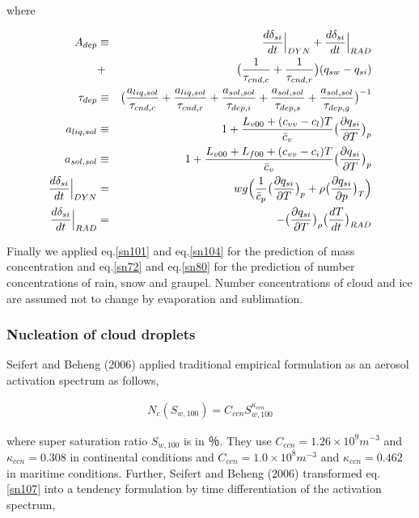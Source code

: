 where

\begin{eqnarray}
A_{dep}&\equiv&\frac{d\delta_{si}}{dt}\Bigr|_{DYN}+\frac{d\delta_{si}}{dt}\Bigr|_{RAD}\nonumber\\
&+&\bigl(\frac{1}{\tau_{cnd,c}}+\frac{1}{\tau_{cnd,r}}\bigr)(q_{sw}-q_{si})\label{sn105}\\
\tau_{dep}&\equiv&\bigl(\frac{a_{liq,sol}}{\tau_{cnd,c}}+\frac{a_{liq,sol}}{\tau_{cnd,r}}+\frac{a_{sol,sol}}{\tau_{dep,i}}+\frac{a_{sol,sol}}{\tau_{dep,s}}+\frac{a_{sol,sol}}{\tau_{dep,g}}\bigr)^{-1}\label{sn106}\\
a_{liq,sol}&\equiv&1+\frac{L_{v00}+(c_{vv}-c_{l})T}{\bar{c}_{v}}\bigl(\frac{\partial q_{si}}{\partial T}\bigr)_{p}\nonumber\\
a_{sol,sol}&\equiv&1+\frac{L_{v00}+L_{f00}+(c_{vv}-c_{i})T}{\bar{c}_{v}}\bigl(\frac{\partial q_{si}}{\partial T}\bigr)_{p}\nonumber\\
\frac{d\delta_{si}}{dt}\Bigr|_{DYN}&=&wg\Bigl(\frac{1}{\bar{c}_{p}}\bigl(\frac{\partial q_{si}}{\partial T}\bigr)_{p}+\rho\bigl(\frac{\partial q_{si}}{\partial p}\bigr)_{T}\Bigr)\nonumber\\
\frac{d\delta_{si}}{dt}\Bigl|_{RAD}&=&-\bigl(\frac{\partial q_{si}}{\partial T}\bigr)_{\rho}\bigl(\frac{dT}{dt}\bigr)_{RAD}\nonumber
\end{eqnarray}

Finally we applied eq.\ref{sn101} and eq.\ref{sn104} for the prediction of mass concentration and eq.\ref{sn72} and eq.\ref{sn80} for the prediction of number concentrations of rain, snow and graupel. Number concentrations of cloud and ice are assumed not to change by evaporation and sublimation.


\subsubsection{Nucleation of cloud droplets}
Seifert and Beheng (2006) applied traditional empirical formulation as an aerosol activation spectrum as follows,

\begin{eqnarray}
N_{c}(S_{w,100})=C_{ccn}S_{w,100}^{\kappa_{ccn}}\label{sn107}
\end{eqnarray}

where super saturation ratio $S_{w,100}$ is in ％. They use $C_{ccn} = 1.26 \times 10^{9} m^{-3}$ and $\kappa_{ccn} = 0.308$ in continental conditions and $C_{ccn} = 1.0 \times 10^{8} m^{-3}$ and $\kappa_{ccn} = 0.462$ in maritime conditions. Further, Seifert and Beheng (2006) transformed eq.\ref{sn107} into a tendency formulation by time differentiation of the activation spectrum,

